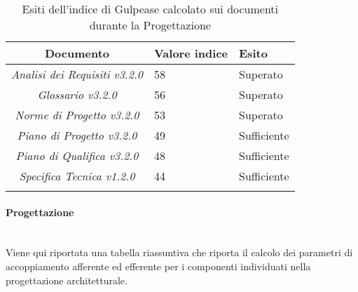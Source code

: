 \begin{longtable}{|c|p{3cm}|p{3cm}|}
\toprule
\textbf{Documento} & \textbf{Valore indice} & \textbf{Esito} \\


\midrule
\emph{Analisi dei Requisiti v3.2.0} & 58 & Superato \\
\midrule
\emph{Glossario v3.2.0} & 56 & Superato \\
\midrule
\emph{Norme di Progetto v3.2.0} & 53  & Superato\\
\midrule
\emph{Piano di Progetto v3.2.0} & 49  & Sufficiente\\
\midrule
\emph{Piano di Qualifica v3.2.0} & 48  & Sufficiente\\
\midrule
\emph{Specifica Tecnica v1.2.0} & 44 & Sufficiente\\
\bottomrule
\caption{Esiti dell'indice di Gulpease calcolato sui documenti durante la Progettazione}
\label{tab:changelog}
\end{longtable}

\paragraph{Progettazione} \hfill\\
Viene qui riportata una tabella riassuntiva che riporta il calcolo dei parametri di accoppiamento afferente ed efferente per i componenti individuati nella progettazione architetturale.

